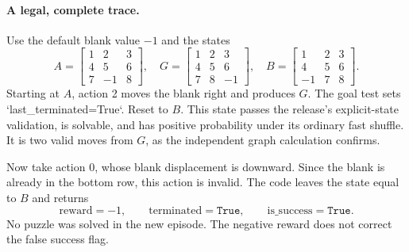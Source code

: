 \documentclass[10pt]{article}
\begin{document}
\paragraph*{A legal, complete trace.}\mbox{}\par
Use the default blank value \(-1\) and the states \[A=\begin{bmatrix}1&2&3\\4&5&6\\7&-1&8\end{bmatrix},
 \quad
 G=\begin{bmatrix}1&2&3\\4&5&6\\7&8&-1\end{bmatrix},
 \quad
 B=\begin{bmatrix}1&2&3\\4&5&6\\-1&7&8\end{bmatrix}.\] Starting at \(A\), action 2 moves the blank right and produces \(G\). The goal test sets `last\_terminated=True`. Reset to \(B\). This state passes the release’s explicit-state validation, is solvable, and has positive probability under its ordinary fast shuffle. It is two valid moves from \(G\), as the independent graph calculation confirms.\par
Now take action 0, whose blank displacement is downward. Since the blank is already in the bottom row, this action is invalid. The code leaves the state equal to \(B\) and returns \[\text{reward}=-1,\qquad
 \text{terminated}=\texttt{True},\qquad
 \text{is\_success}=\texttt{True}.\] No puzzle was solved in the new episode. The negative reward does not correct the false success flag.\par
\end{document}
